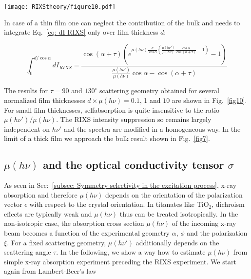 \documentclass[twocolumn,prb,twocolumn,amsmath,superscriptaddress,nofootinbib,amssymb]{revtex4-1}
\begin{document}
\begin{widetext}
\begin{figure*}[htbp]
\begin{center}
\texttt{[image: RIXStheory/figure10.pdf]}
\caption{\label{fig10} Self absorption in thin film samples. Results are shown for two experimental geometries with \textbf{(left)} $\tau=90^{\circ}$ and \textbf{(right)} $\tau=130^{\circ}$ scattering angle in units of the total RIXS signal created in the solid. The characteristic parameter $\mu(h\nu')/\mu(h\nu)$ is varied over 4 orders of magnitude for three different normalized film thicknesses $d\times\mu(h\nu)$.}
\end{center}
\end{figure*}

In case of a thin film one can neglect the contribution of the bulk and needs to integrate Eq.~\ref{eq: dI RIXS} only over film thickness $d$:

\begin{equation}
\int_0^{d/\cos\alpha}dI_{RIXS}=
\frac{\cos(\alpha+\tau)(e^{\mu(h\nu) \frac{d}{\cos\alpha} \left( \frac{\mu(h\nu')}{\mu(h\nu)} \frac{\cos\alpha}{\cos(\alpha+\tau)} -1\right) }-1)}
{\frac{\mu(h\nu')}{\mu(h\nu)}\cos\alpha-\cos(\alpha+\tau)}
\end{equation}

The results for $\tau=90$ and $130^{\circ}$ scattering geometry obtained for several normalized film thicknesses $d\times\mu(h\nu)=0.1$, 1 and $10$ are shown in Fig.~\ref{fig10}. For small film thicknesses, selfabsorption is quite insensitive to the ratio $\mu(h\nu')/\mu(h\nu)$. The RIXS intensity suppression so remains largely independent on $h\nu'$ and the spectra are modified in a homogeneous way. In the limit of a thick film we approach the bulk result shown in Fig.~\ref{fig7}.


\subsection{$\mu(h\nu)$ and the optical conductivity tensor $\sigma$}

As seen in Sec:~\ref{subsec: Symmetry selectivity in the excitation process}, x-ray absorption and therefore $\mu(h\nu)$ depends on the orientation of the polarization vector $\epsilon$ with respect to the crystal orientation. In titanates like TiO$_2$, dichroism effects are typically weak and $\mu(h\nu)$ thus can be treated isotropically. In the non-isotropic case, the absorption cross section $\mu(h\nu)$ of the incoming x-ray beam becomes a function of the experimental geometry $\alpha$, $\phi$ and the polarization $\xi$. For a fixed scattering geometry, $\mu(h\nu')$ additionally depends on the scattering angle $\tau$. In the following, we show a way how to estimate $\mu(h\nu)$ from simple x-ray absorption experiment preceding the RIXS experiment. We start again from Lambert-Beer's law


\end{widetext}
\end{document}
